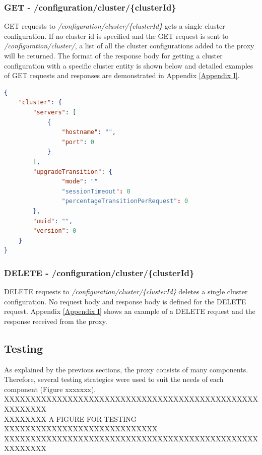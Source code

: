 \documentclass[a4paper,11pt,twoside]{article}
\begin{document}
\subsubsection{GET - /configuration/cluster/\{clusterId\}} 
GET requests to \textit{/configuration/cluster/\{clusterId\}} gets a single cluster configuration. If no cluster id is specified and the GET request is sent to \textit{/configuration/cluster/}, a list of all the cluster configurations added to the proxy will be returned. The format of the response body for getting a cluster configuration with a specific cluster entity is shown below and detailed examples of GET requests and responses are demonstrated in Appendix \ref{Appendix  I}.\\

\begin{lstlisting}[language=json,firstnumber=1]
{
    "cluster": {
        "servers": [
            {
                "hostname": "",
                "port": 0
            }
        ],
        "upgradeTransition": {
                "mode": ""
                "sessionTimeout": 0  
                "percentageTransitionPerRequest": 0  
        },
        "uuid": "",
        "version": 0
    }
}

\end{lstlisting}

\subsubsection{DELETE - /configuration/cluster/\{clusterId\}}
DELETE requests to \textit{/configuration/cluster/\{clusterId\}} deletes a single cluster configuration. No request body and response body is defined for the DELETE request. Appendix \ref{Appendix I} shows an example of a DELETE request and the response received from the proxy.

\subsection{Testing}
As explained by the previous sections, the proxy consists of many components. Therefore, several testing strategies were used to suit the needs of each component (Figure xxxxxxx).\\

XXXXXXXXXXXXXXXXXXXXXXXXXXXXXXXXXXXXXXXXXXXXXXXXXXXXXXXX\\
XXXXXXXX A FIGURE FOR TESTING XXXXXXXXXXXXXXXXXXXXXXXXXXXXX\\
XXXXXXXXXXXXXXXXXXXXXXXXXXXXXXXXXXXXXXXXXXXXXXXXXXXXXXXX\\ 
\end{document}
